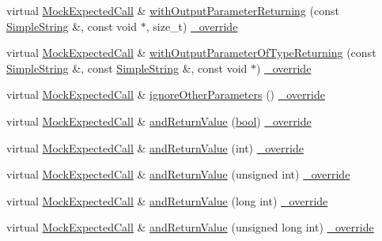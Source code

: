 \begin{DoxyCompactItemize}
\item 
virtual \hyperlink{class_mock_expected_call}{Mock\+Expected\+Call} \& \hyperlink{class_mock_ignored_expected_call_ad224c2595491a45c77078e56a71a527c}{with\+Output\+Parameter\+Returning} (const \hyperlink{class_simple_string}{Simple\+String} \&, const void $\ast$, size\+\_\+t) \hyperlink{_cpp_u_test_config_8h_a049bea15dd750e15869863c94c1efc3b}{\+\_\+override}
\item 
virtual \hyperlink{class_mock_expected_call}{Mock\+Expected\+Call} \& \hyperlink{class_mock_ignored_expected_call_ace602cddf220bdaba46a1798f9a7619a}{with\+Output\+Parameter\+Of\+Type\+Returning} (const \hyperlink{class_simple_string}{Simple\+String} \&, const \hyperlink{class_simple_string}{Simple\+String} \&, const void $\ast$) \hyperlink{_cpp_u_test_config_8h_a049bea15dd750e15869863c94c1efc3b}{\+\_\+override}
\item 
virtual \hyperlink{class_mock_expected_call}{Mock\+Expected\+Call} \& \hyperlink{class_mock_ignored_expected_call_a2031559639d2ff0a9de1334a69034049}{ignore\+Other\+Parameters} () \hyperlink{_cpp_u_test_config_8h_a049bea15dd750e15869863c94c1efc3b}{\+\_\+override}
\item 
virtual \hyperlink{class_mock_expected_call}{Mock\+Expected\+Call} \& \hyperlink{class_mock_ignored_expected_call_ad168cee1e71c0550793187f875902988}{and\+Return\+Value} (\hyperlink{avb__gptp_8h_af6a258d8f3ee5206d682d799316314b1}{bool}) \hyperlink{_cpp_u_test_config_8h_a049bea15dd750e15869863c94c1efc3b}{\+\_\+override}
\item 
virtual \hyperlink{class_mock_expected_call}{Mock\+Expected\+Call} \& \hyperlink{class_mock_ignored_expected_call_ad2db00b8ebf9ab59c803e49b3a1f78b5}{and\+Return\+Value} (int) \hyperlink{_cpp_u_test_config_8h_a049bea15dd750e15869863c94c1efc3b}{\+\_\+override}
\item 
virtual \hyperlink{class_mock_expected_call}{Mock\+Expected\+Call} \& \hyperlink{class_mock_ignored_expected_call_a5ca3704cebab26da4f89226ee4939d9b}{and\+Return\+Value} (unsigned int) \hyperlink{_cpp_u_test_config_8h_a049bea15dd750e15869863c94c1efc3b}{\+\_\+override}
\item 
virtual \hyperlink{class_mock_expected_call}{Mock\+Expected\+Call} \& \hyperlink{class_mock_ignored_expected_call_ae31295f3104c04e3b6cc424597d296a2}{and\+Return\+Value} (long int) \hyperlink{_cpp_u_test_config_8h_a049bea15dd750e15869863c94c1efc3b}{\+\_\+override}
\item 
virtual \hyperlink{class_mock_expected_call}{Mock\+Expected\+Call} \& \hyperlink{class_mock_ignored_expected_call_a0beea441b9d5984214f8cbe54237093c}{and\+Return\+Value} (unsigned long int) \hyperlink{_cpp_u_test_config_8h_a049bea15dd750e15869863c94c1efc3b}{\+\_\+override}

\end{DoxyCompactItemize}
